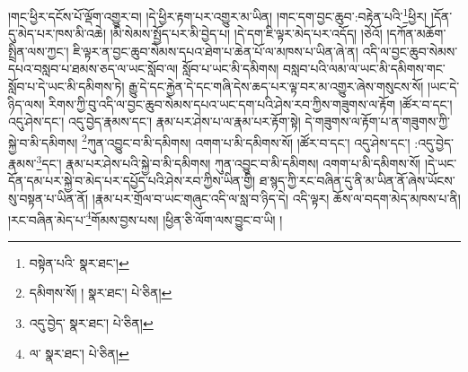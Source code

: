 །གང་ཕྱིར་དངོས་པོ་ལྡོག་འགྱུར་བ། །དེ་ཕྱིར་རྟག་པར་འགྱུར་མ་ཡིན། །གང་དག་བྱང་ཆུབ་:བརྟེན་པའི་\footnote{བསྟེན་པའི་  སྣར་ཐང་། }ཕྱིར། །དོན་དུ་མེད་པར་ཁས་མི་འཆེ། །མི་སེམས་སྤྱོད་པར་མི་བྱེད་པ། །དེ་དག་ཇི་ལྟར་མེད་པར་འདོད། །ཅེའོ། །དཀོན་མཆོག་སྤྲིན་ལས་ཀྱང་། ཇི་ལྟར་ན་བྱང་ཆུབ་སེམས་དཔའ་ཐེག་པ་ཆེན་པོ་ལ་མཁས་པ་ཡིན་ཞེ་ན། འདི་ལ་བྱང་ཆུབ་སེམས་དཔའ་བསླབ་པ་ཐམས་ཅད་ལ་ཡང་སློབ་ལ། སློབ་པ་ཡང་མི་དམིགས། བསླབ་པའི་ལམ་ལ་ཡང་མི་དམིགས་གང་སློབ་པ་དེ་ཡང་མི་དམིགས་ཏེ། རྒྱུ་དེ་དང་རྐྱེན་དེ་དང་གཞི་དེས་ཆད་པར་ལྟ་བར་མ་འགྱུར་ཞེས་གསུངས་སོ། །ཡང་དེ་ཉིད་ལས། རིགས་ཀྱི་བུ་འདི་ལ་བྱང་ཆུབ་སེམས་དཔའ་ཡང་དག་པའི་ཤེས་རབ་ཀྱིས་གཟུགས་ལ་རྟོག །ཚོར་བ་དང་། འདུ་ཤེས་དང་། འདུ་བྱེད་རྣམས་དང་། རྣམ་པར་ཤེས་པ་ལ་རྣམ་པར་རྟོག་སྟེ། དེ་གཟུགས་ལ་རྟོག་པ་ན་གཟུགས་ཀྱི་སྐྱེ་བ་མི་དམིགས། \footnote{དམིགས་སོ། །   སྣར་ཐང་།  པེ་ཅིན། }ཀུན་འབྱུང་བ་མི་དམིགས། འགག་པ་མི་དམིགས་སོ། །ཚོར་བ་དང་། འདུ་ཤེས་དང་། :འདུ་བྱེད་རྣམས་\footnote{འདུ་བྱེད་  སྣར་ཐང་།  པེ་ཅིན། }དང་། རྣམ་པར་ཤེས་པའི་སྐྱེ་བ་མི་དམིགས། ཀུན་འབྱུང་བ་མི་དམིགས། འགག་པ་མི་དམིགས་སོ། །དེ་ཡང་དོན་དམ་པར་སྐྱེ་བ་མེད་པར་དཔྱོད་པའི་ཤེས་རབ་ཀྱིས་ཡིན་གྱི། ཐ་སྙད་ཀྱི་རང་བཞིན་དུ་ནི་མ་ཡིན་ནོ་ཞེས་ཡོངས་སུ་བསྟན་པ་ཡིན་ནོ། །རྣམ་པར་གྲོལ་བ་ཡང་གཞུང་འདི་ལ་སླ་བ་ཉིད་དེ། འདི་ལྟར། ཆོས་ལ་བདག་མེད་མཁས་པ་ནི། །རང་བཞིན་མེད་པ་\footnote{ལ་  སྣར་ཐང་།  པེ་ཅིན། }གོམས་བྱས་པས། །ཕྱིན་ཅི་ལོག་ལས་བྱུང་བ་ཡི། །
